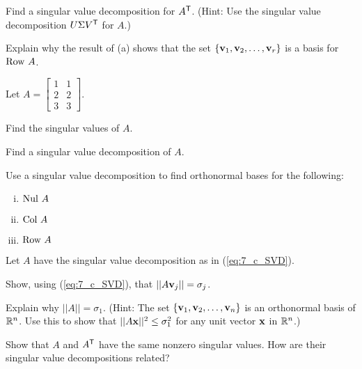 	\ba
	\item Find a singular value decomposition for $A^{\mathsf{T}}$. (Hint: Use the singular value decomposition $U \Sigma V^{\mathsf{T}}$ for $A$.)
	


	\item Explain why the result of (a) shows that the set $\{\mathbf{v}_1, \mathbf{v}_2, \ldots, \mathbf{v}_r\}$ is a basis for $\text{Row } A$. 
	
	\ea
 


\item Let $A = \left[ \begin{array}{cc} 1&1 \\ 2&2 \\ 3&3 \end{array} \right]$.
	\ba
	\item Find the singular values of $A$.
	\item Find a singular value decomposition of $A$. 
	\item Use a singular value decomposition to find orthonormal bases for the following:
		\begin{enumerate}[i.]	
		\item $\text{Nul } A$
		\item $\text{Col } A$
		\item $\text{Row } A$
		\end{enumerate}
	\ea

\item Let $A$ have the singular value decomposition as in (\ref{eq:7_c_SVD}).
	\ba
	\item Show, using (\ref{eq:7_c_SVD}), that $||A\mathbf{v}_j|| = \sigma_j$.
	

	\item Explain why $||A|| = \sigma_1$. (Hint: The set $\{\mathbf{v}_1, \mathbf{v}_2, \ldots, \mathbf{v}_n\}$ is an orthonormal basis of $\mathbb{R}^n$. Use this to show that $||A \mathbf{x}||^2  \leq \sigma_1^2$ for any unit vector $\mathbf{x}$ in $\mathbb{R}^n$.) 
	
	
	\ea


\item Show that $A$ and $A^{\mathsf{T}}$ have the same nonzero singular values. How are their singular value decompositions related?

